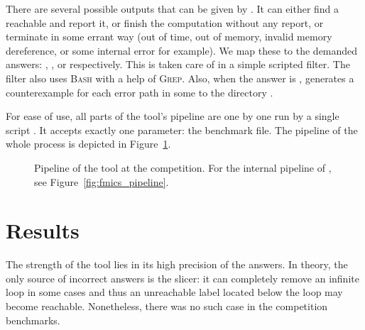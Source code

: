 There are several possible outputs that can be given by \klee.  It can either
find a reachable  and report it, or finish the computation
without any report, or terminate in some errant way (out of time, out of
memory, invalid memory dereference, or some internal error for example). We
map these to the demanded answers: , , or
 respectively. This is taken care of in a simple scripted
filter.  The filter also uses \textsc{Bash} with a help of \textsc{Grep}.
Also, when the answer is , \klee generates a counterexample for
each error path in some  to the directory
.

For ease of use, all parts of the tool's pipeline are one by one run by a
single script . It accepts exactly one parameter: the benchmark
file. The pipeline of the whole process is depicted in
Figure~\ref{fig:svcomp_pipeline}.

\begin{figure}[tb]
\begin{center}
\end{center}
  \caption{Pipeline of the tool at the competition. For the internal pipeline
  of \symbio, see Figure~\ref{fig:fmics_pipeline}.}
  \label{fig:svcomp_pipeline}
\end{figure}


\section{Results}\label{sec:svcomp_results}

The strength of the tool lies in its high precision of the answers. In theory,
the only source of incorrect answers is the slicer: it can completely remove
an infinite loop in some cases and thus an unreachable  label
located below the loop may become reachable. Nonetheless, there was no such
case in the competition benchmarks. 

